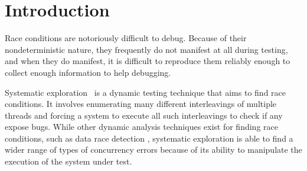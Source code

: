 \documentclass{llncs}
\begin{document}




\section{Introduction}

Race conditions are notoriously difficult to debug.
Because of their nondeterministic nature, they frequently do not manifest at all during testing, and when they do manifest, it is difficult to reproduce them reliably enough to collect enough information to help debugging.

Systematic exploration~\cite{verisoft} is a dynamic testing technique that aims to find race conditions. It involves enumerating many different interleavings of multiple threads and forcing a system to execute all such interleavings to check if any expose bugs.
While other dynamic analysis techniques exist for finding race conditions, such as data race detection \cite{datacollider},
systematic exploration is able to find a wider range of types of concurrency errors because of its ability to manipulate the execution of the system under test.

\end{document}
